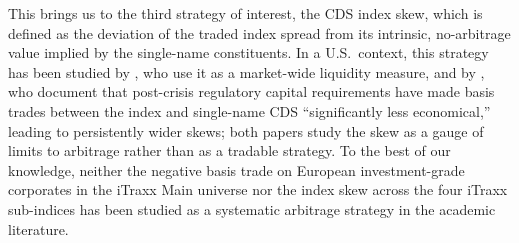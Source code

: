 This brings us to the third strategy of interest, the CDS index skew,
which is defined as the deviation of the traded index spread from its
intrinsic, no-arbitrage value implied by the single-name
constituents. In a U.S.\ context, this strategy has been studied by
\citet{junge2015liquidity}, who use it as a market-wide liquidity
measure, and by \citet{boyarchenko2016trends}, who document that
post-crisis regulatory capital requirements have made basis trades
between the index and single-name CDS ``significantly less
economical,'' leading to persistently wider skews; both papers study
the skew as a gauge of limits to arbitrage rather than as a tradable
strategy. To the best of our knowledge, neither the
negative basis trade on European investment-grade corporates in the
iTraxx Main universe nor the index skew across the four iTraxx
sub-indices has been studied as a systematic arbitrage strategy in
the academic literature.

